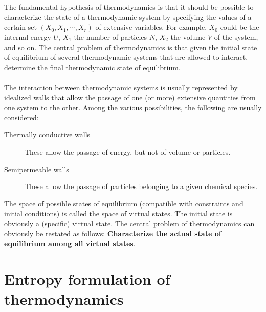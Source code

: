 \\ \\
The fundamental hypothesis of thermodynamics is that it should be possible to characterize the state of a thermodynamic system by specifying the values of a certain set $(X_0, X_1, \cdots, X_r)$ of extensive variables. For example, $X_0$ could be the internal energy $U$, $X_1$ the number of particles $N$, $X_2$ the volume $V$ of the system, and so on.
The central problem of thermodynamics is that given the initial state of equilibrium of several thermodynamic systems that are allowed to interact, determine the final thermodynamic state of equilibrium.
\\ \\
The interaction between thermodynamic systems is usually represented by idealized walls that allow the passage of one (or more) extensive quantities from one system to the other.
Among the various possibilities, the following are usually considered:
\begin{description}
\item[Thermally conductive walls] These allow the passage of energy, but not of volume or particles. 
\item[Semipermeable walls] These allow the passage of particles belonging to a given chemical species.
\end{description}
The space of possible states of equilibrium (compatible with constraints and initial conditions) is called the space of virtual states. The initial state is obviously a (specific) virtual state. The central problem of thermodynamics can obviously be restated as follows:
\textbf{Characterize the actual state of equilibrium among all virtual states}.

\section{Entropy formulation of thermodynamics}

